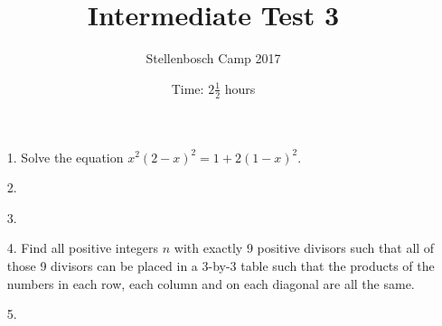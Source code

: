 \documentclass[12pt]{article}
\title{Intermediate Test 3}
\author{Stellenbosch Camp 2017}
\date{Time: $2\frac{1}{2}$ hours}
\begin{document}
 \maketitle

\begin{enumerate}

\item[1.]  %
Solve the equation $x^2(2-x)^2 = 1 + 2(1-x)^2$.


\item[2.] %


\item[3.] %


\item[4.] %
Find all positive integers $n$ with exactly 9 positive divisors such that all of those 9 divisors can be placed in a 3-by-3 table such that the products of the numbers in each row, each column and on each diagonal are all the same.


\item[5.] %


\end{enumerate}
\end{document}
